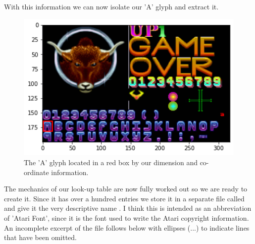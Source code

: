 \begin{figure}[H]
  {
    \setlength{\tabcolsep}{3.0pt}
    \setlength\cmidrulewidth{\lightrulewidth} %
    \begin{adjustbox}{width=3cm,center}
    \end{adjustbox}
  }
\end{figure}
\vspace{-1cm}
With this information we can now isolate our 'A' glyph and extract it.

\begin{figure}[H]
    \centering
    \begin{adjustbox}{width=7.5cm,center}
      \includegraphics[width=12cm]{src/characters/plot.png}%
    \end{adjustbox}
\caption{The 'A' glyph located in a red box by our dimension and co-ordinate information.}
\end{figure}

The mechanics of our look-up table are now fully worked out so we are ready to create it. Since it has over a hundred entries we store it in 
a separate file called  and give it the very descriptive name . I think this is intended as an abbreviation of
'Atari Font', since it is the font used to write the Atari copyright information. An incomplete excerpt of the file follows below with
ellipses (...) to indicate lines that have been omitted.

